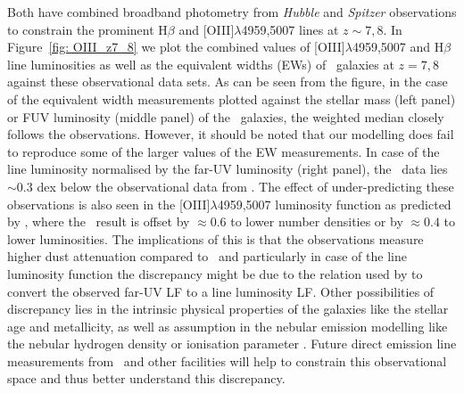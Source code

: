 Both \cite{deBarros19_OIIIHbeta,Endsley2020} have combined broadband photometry from \textit{Hubble} and \textit{Spitzer} observations to constrain the prominent H$\beta$ and [OIII]$\lambda$4959,5007 lines at $z\sim 7,8$. In Figure~\ref{fig: OIII_z7_8} we plot the combined values of [OIII]$\lambda$4959,5007 and H$\beta$ line luminosities as well as the equivalent widths (EWs) of \flares\, galaxies at $z=7,8$ against these observational data sets. As can be seen from the figure, in the case of the equivalent width measurements plotted against the stellar mass (left panel) or FUV luminosity (middle panel) of the \flares\, galaxies, the weighted median closely follows the observations. However, it should be noted that our modelling does fail to reproduce some of the larger values of the EW measurements. In case of the line luminosity normalised by the far-UV luminosity (right panel), the \flares\, data lies $\sim 0.3$ dex below the observational data from \cite{deBarros19_OIIIHbeta}. The effect of under-predicting these observations is also seen in the [OIII]$\lambda$4959,5007 luminosity function as predicted by \cite{deBarros19_OIIIHbeta}, where the \flares\, result is offset by $\approx0.6$ to lower number densities or by $\approx0.4$ to lower luminosities. The implications of this is that the observations measure higher dust attenuation compared to \flares\, and particularly in case of the line luminosity function the discrepancy might be due to the relation used by \cite{deBarros19_OIIIHbeta} to convert the observed far-UV LF to a line luminosity LF. Other possibilities of discrepancy lies in the intrinsic physical properties of the galaxies like the stellar age and metallicity, as well as assumption in the nebular emission modelling like the nebular hydrogen density or ionisation parameter \citep[see][]{Wilkins2020}. Future direct emission line measurements from \jwst\, and other facilities will help to constrain this observational space and thus better understand this discrepancy. %

